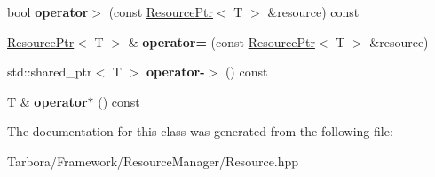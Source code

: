 \begin{DoxyCompactItemize}
\item 
\mbox{\label{classTarbora_1_1ResourcePtr_aaf25911bc397a4c42c82fd4044d7f542}} 
bool {\bfseries operator$>$} (const \hyperlink{classTarbora_1_1ResourcePtr}{Resource\+Ptr}$<$ T $>$ \&resource) const
\item 
\mbox{\label{classTarbora_1_1ResourcePtr_a749a490d6652b2fa23355be278206fd6}} 
\hyperlink{classTarbora_1_1ResourcePtr}{Resource\+Ptr}$<$ T $>$ \& {\bfseries operator=} (const \hyperlink{classTarbora_1_1ResourcePtr}{Resource\+Ptr}$<$ T $>$ \&resource)
\item 
\mbox{\label{classTarbora_1_1ResourcePtr_aebd7979705d3f4c6a666edcaa80287c9}} 
std\+::shared\+\_\+ptr$<$ T $>$ {\bfseries operator-\/$>$} () const
\item 
\mbox{\label{classTarbora_1_1ResourcePtr_a5d04bd33cf42b9a6ae4ecc39a2ea6613}} 
T \& {\bfseries operator$\ast$} () const
\end{DoxyCompactItemize}


The documentation for this class was generated from the following file\+:\begin{DoxyCompactItemize}
\item 
Tarbora/\+Framework/\+Resource\+Manager/Resource.\+hpp\end{DoxyCompactItemize}
